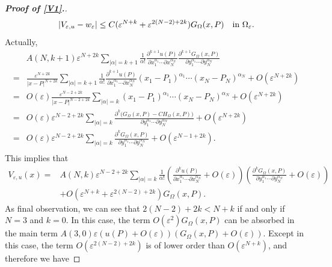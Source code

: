 \documentclass[10pt,a4paper]{amsart}
\renewcommand\O\Omega
\newcommand\e\varepsilon
\begin{document}
\begin{proof}[\bf Proof of \eqref{V1}.]
\begin{equation}
					|	V_{\e,u}-w_\e |\leq C(\e^{N+k}+\e^{2(N-2)+2k})G_{\Omega}(x,P)\quad\hbox{in }\O_\e.
				\end{equation}
                Actually,
                 \begin{align*}
					&A(N,k+1) \e^{N+2k}	\sum_{|\alpha|=k+1}\frac1{\alpha!}
					\frac{\partial^{k+1}u(P)}{\partial x_1^{\alpha_1}\cdots\partial x_N^{\alpha_N}}
					\frac{\partial^{k+1}G_{\Omega}(x,P)}{\partial y_1^{\alpha_1}\cdots\partial y_N^{\alpha_N}}\\
                    =&\frac{\e^{N+2k}}{|x-P|^{N+2k}}\sum_{|\alpha|=k+1}\frac1{\alpha!}
					\frac{\partial^{k+1}u(P)}{\partial x_1^{\alpha_1}\cdots\partial x_N^{\alpha_N}}(x_1-P_1)^{\alpha_1}\cdots(x_N-P_N)^{\alpha_N}+O(\e^{N+2k})\\
                    =& O(\e)\frac{\e^{N-2+2k}}{|x-P|^{N-2+2k}}\sum_{|\alpha|=k}(x_1-P_1)^{\alpha_1}\cdots(x_N-P_N)^{\alpha_N}+O(\e^{N+2k})\\
                    =&O(\e)\e^{N-2+2k}	\sum_{|\alpha|=k}
					\frac{\partial^k\Big(G_{\Omega}(x,P)-CH_{\Omega}(x,P)\Big)}{\partial y_1^{\alpha_1}\cdots\partial y_N^{\alpha_N}}+O(\e^{N+2k})\\
                    =&O(\e)\e^{N-2+2k}	\sum_{|\alpha|=k}
					\frac{\partial^kG_{\Omega}(x,P)}{\partial y_1^{\alpha_1}\cdots\partial y_N^{\alpha_N}}+O(\e^{N-1+2k}).\\
                \end{align*}
                This implies that 
                 \begin{equation}\label{eq11102025-2}
                 \begin{aligned}
                   V_{\e,u}(x)=&A(N,k)\e^{N-2+2k}
					\sum_{|\alpha|=k}\frac1{\alpha!}
					\left(\frac{\partial^ku(P)}{\partial x_1^{\alpha_1}\cdots\partial x_N^{\alpha_N}}
                    +O(\e)\right)
					\left(\frac{\partial^kG_{\Omega}(x,P)}{\partial y_1^{\alpha_1}\cdots\partial y_N^{\alpha_N}}
                    +O(\e)\right)\\
                    &+O(\e^{N+k}+\e^{2(N-2)+2k})G_{\Omega}(x,P).  
                 \end{aligned}
				\end{equation}
                As final observation, we can see that $2(N-2)+2k<N+k$ if and only if $N=3$ and $k=0$. 
               In this case, the term $O(\e^2)G_\O(x,P)$ can be absorbed in the main term $A(3,0)\e (u(P)+O(\e))(G_\O(x,P)+O(\e))$.
                Except in this case, the term $O(\e^{2(N-2)+2k})$
                 is of lower order than $O(\e^{N+k})$, and therefore we have

\end{proof}
\end{document}
